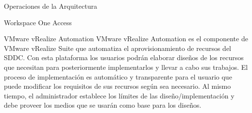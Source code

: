\begin{subsection}{Operaciones de la Arquitectura}
\begin{subsubsection}{Workspace One Access}

    \end{subsubsection}

    \begin{subsubsection}{VMware vRealize Automation}
        VMware vRealize Automation es el componente de VMware vRealize Suite que automatiza el aprovisionamiento de recursos del SDDC. Con esta plataforma los usuarios podrán elaborar diseños de los recursos que necesitan para posteriormente implementarlos y llevar a cabo sus trabajos. El proceso de implementación es automático y transparente para el usuario que puede modificar los requisitos de sus recursos según sea necesario. Al mismo tiempo, el administrador establece los límites de las diseño/implementación y debe proveer los medios que se usarán como base para los diseños.
        



\end{subsubsection}
\end{subsection}
